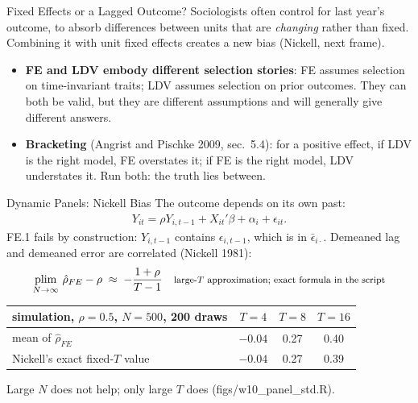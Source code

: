 \documentclass[aspectratio=169,11pt,xcolor=dvipsnames]{beamer}
\newcommand{\srcp}[1]{{\scriptsize\color{gray}(#1)}}
\DeclareMathOperator{\plim}{plim}
\begin{document}
\begin{frame}[allowframebreaks,t]{Fixed Effects or a Lagged Outcome?}
Sociologists often control for last year's outcome, to absorb differences
between units that are \emph{changing} rather than fixed. Combining it with unit
fixed effects creates a new bias (Nickell, next frame).
\vskip3pt
\begin{itemize}\itemsep2pt
  \item \textbf{FE and LDV embody different selection stories}: FE assumes
        selection on time-invariant traits; LDV assumes selection on prior
        outcomes. They can both be valid, but they are different assumptions and
        will generally give different answers.
  \item \textbf{Bracketing} \srcp{Angrist and Pischke 2009, sec.~5.4}: for a
        positive effect, if LDV is the right model, FE overstates it; if FE is
        the right model, LDV understates it. Run both: the truth lies between.
\end{itemize}
\end{frame}

\begin{frame}{Dynamic Panels: Nickell Bias}
The outcome depends on its own past:
\begin{align*}
  Y_{it} = \rho Y_{i,t-1} + X_{it}'\beta + \alpha_i + \epsilon_{it} .
\end{align*}
FE.1 fails by construction: $Y_{i,t-1}$ contains $\epsilon_{i,t-1}$, which is in
$\bar\epsilon_{i\cdot}$. Demeaned lag and demeaned error are correlated
\srcp{Nickell 1981}:
\begin{align*}
  \plim_{N\to\infty}\, \hat\rho_{FE} - \rho \;\approx\; -\frac{1 + \rho}{T - 1}
   && \text{\footnotesize large-$T$ approximation; exact formula in the script}
\end{align*}
\begin{center}\small
\renewcommand{\arraystretch}{1.1}
\begin{tabular}{@{}lccc@{}}
\toprule
simulation, $\rho = 0.5$, $N = 500$, 200 draws & $T = 4$ & $T = 8$ & $T = 16$ \\
\midrule
mean of $\hat\rho_{FE}$ & $-0.04$ & 0.27 & 0.40 \\
Nickell's exact fixed-$T$ value & $-0.04$ & 0.27 & 0.39 \\
\bottomrule
\end{tabular}
\end{center}
{\footnotesize Large $N$ does not help; only large $T$ does \srcp{figs/w10\_panel\_std.R}.}
\end{frame}
\end{document}
